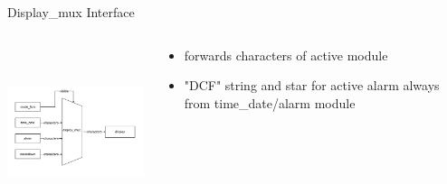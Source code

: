 \documentclass{beamer}
\begin{document}
\begin{frame}{Display\_mux Interface}
    \begin{columns}
    \begin{column}{6cm}
        \includegraphics[width=60mm, height=50mm]{pictures/display_mux_interface.png}
    \end{column}
    \begin{column}{6cm}
    \begin{itemize}
        \item forwards characters of active module
        \item "DCF" string and star for active alarm always from time\_date/alarm module 
    \end {itemize}
    \end{column}
    \end{columns}
  \end{frame}
\end{document}
